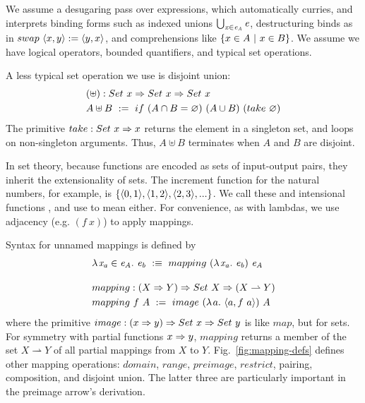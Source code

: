 \documentclass{llncs}
\newcommand{\figref}[1]{Fig.~\ref{#1}}
\newcommand{\pto}{\rightharpoonup}
\begin{document}
We assume a desugaring pass over \lzfclang expressions, which automatically curries, and interprets binding forms such as indexed unions $\textstyle\bigcup_{\mathit{x} \in \mathit{e_A}}\mathit{e}$, destructuring binds as in $swap~\langle{x,y}\rangle := \langle{y,x}\rangle$, and comprehensions like $\lbrace {x \in A} \ \lvert\ {x \in B} \rbrace$.
We assume we have logical operators, bounded quantifiers, and typical set operations.

A less typical set operation we use is disjoint union:
\begin{equation}
\begin{aligned}
	&(\uplus) : Set~x \Rightarrow Set~x \Rightarrow Set~x \\
	&A \uplus B \ := \ if~(A \cap B = \varnothing)~(A \cup B)~(take~\varnothing)
\end{aligned}
\end{equation}
The primitive $take : Set~x \Rightarrow x$ returns the element in a singleton set, and loops on non-singleton arguments.
Thus, $A \uplus B$ terminates when $A$ and $B$ are disjoint.

In set theory, because functions are encoded as sets of input-output pairs, they inherit the extensionality of sets.
The increment function for the natural numbers, for example, is $\{{\langle{0,1}\rangle,\langle{1,2}\rangle,\langle{2,3}\rangle,...}\}$.
We call these  and intensional functions , and use  to mean either.
For convenience, as with lambdas, we use adjacency (e.g. $(f~x)$) to apply mappings.

Syntax for unnamed mappings is defined by
\begin{align}
	&\fun{\mathit{x_a} \in \mathit{e_A}}{\mathit{e_b}} \ :\equiv\ mapping~(\fun{\mathit{x_a}}\mathit{e_b})~\mathit{e_A} \\
\nonumber\\[-6pt]
	&\begin{aligned}
		&mapping : (X \tto Y) \tto Set~X \tto (X \pto Y) \\
		&mapping~f~A \ := \ image~(\fun{a}{\pair{a,f~a}})~A
	\end{aligned}
\end{align}
where the primitive $image : (x \Rightarrow y) \Rightarrow Set~x \Rightarrow Set~y$ is like $map$, but for sets.
For symmetry with partial functions $x \Rightarrow y$, $mapping$ returns a member of the set $X \pto Y$ of all partial mappings from $X$ to $Y$.
\figref{fig:mapping-defs} defines other mapping operations: $domain$, $range$, $preimage$, $restrict$, pairing, composition, and disjoint union.
The latter three are particularly important in the preimage arrow's derivation.
\end{document}
